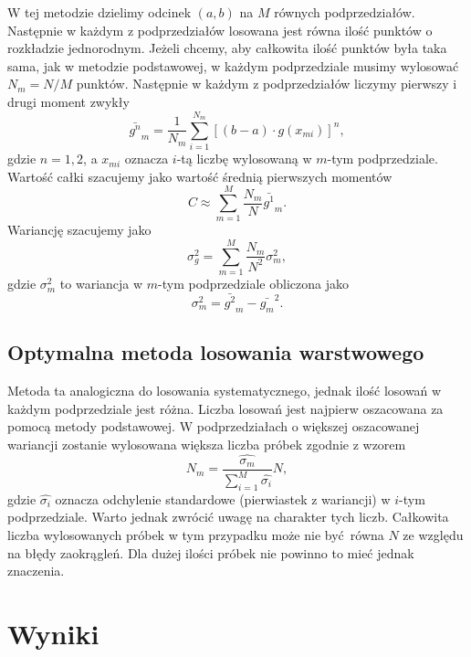 \documentclass[a4paper, 12pt]{article}
\begin{document}
    W tej metodzie dzielimy odcinek $(a,b)$ na $M$ równych podprzedziałów.
    Następnie w każdym z podprzedziałów losowana jest równa ilość punktów o rozkładzie jednorodnym.
    Jeżeli chcemy, aby całkowita ilość punktów była taka sama, jak w metodzie podstawowej, w każdym podprzedziale musimy wylosować $N_m = N/M$ punktów.
    Następnie w każdym z podprzedziałów liczymy pierwszy i drugi moment zwykły
    \begin{equation}
        \bar{g^n}_m = \frac{1}{N_m} \sum_{i=1}^{N_m} \left[ (b-a) \cdot g(x_{mi}) \right]^n,
    \end{equation}
    gdzie $n = 1,2$, a $x_{mi}$ oznacza $i$-tą liczbę wylosowaną w $m$-tym podprzedziale.
    Wartość całki szacujemy jako wartość średnią pierwszych momentów
    \begin{equation}
        C \approx \sum_{m=1}^{M} \frac{N_m}{N} \bar{g^1}_m.
    \end{equation}  
    Wariancję szacujemy jako 
    \begin{equation}
        \sigma_g^2 = \sum_{m = 1}^{M} \frac{N_m}{N^2} \sigma^2_m,
    \end{equation}
    gdzie $\sigma_m^2$ to wariancja w $m$-tym podprzedziale obliczona jako
    \begin{equation}
        \sigma^2_m = \bar{g^2}_m - \bar{g_m}^2. 
    \end{equation}

    \subsection*{Optymalna metoda losowania warstwowego}

    Metoda ta analogiczna do losowania systematycznego, jednak ilość losowań w każdym podprzedziale jest różna.
    Liczba losowań jest najpierw oszacowana za pomocą metody podstawowej. 
    W podprzedziałach o większej oszacowanej wariancji zostanie wylosowana większa liczba próbek zgodnie z wzorem
    \begin{equation}
        N_m  = \frac{\hat{\sigma_m}}{\sum_{i = 1}^{M} \hat{\sigma_i}}N,
    \end{equation}
    gdzie $\hat{\sigma_i}$ oznacza odchylenie standardowe (pierwiastek z wariancji) w $i$-tym podprzedziale.
    Warto jednak zwrócić uwagę na charakter tych liczb.
    Całkowita liczba wylosowanych próbek w tym przypadku może nie być równa $N$ ze względu na błędy zaokrągleń.
    Dla dużej ilości próbek nie powinno to mieć jednak znaczenia.

    \section{Wyniki}
\end{document}
